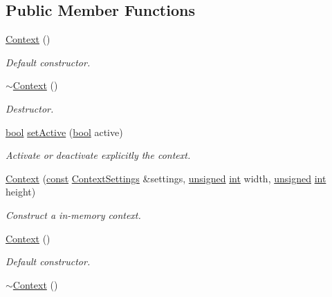 \subsection*{Public Member Functions}
\begin{DoxyCompactItemize}
\item 
\hyperlink{classsf_1_1_context_aba22797a790706ca2c5c04ee39f2b555}{Context} ()
\begin{DoxyCompactList}\small\item\em Default constructor. \end{DoxyCompactList}\item 
\hyperlink{classsf_1_1_context_a805b1bbdb3e52b1fda7c9bf2cd6ca86b}{$\sim$\-Context} ()
\begin{DoxyCompactList}\small\item\em Destructor. \end{DoxyCompactList}\item 
\hyperlink{term__entry_8h_a002004ba5d663f149f6c38064926abac}{bool} \hyperlink{classsf_1_1_context_a0806f915ea81ae1f4e8135a7a3696562}{set\-Active} (\hyperlink{term__entry_8h_a002004ba5d663f149f6c38064926abac}{bool} active)
\begin{DoxyCompactList}\small\item\em Activate or deactivate explicitly the context. \end{DoxyCompactList}\item 
\hyperlink{classsf_1_1_context_a2a9e3529e48919120e6b6fc10bad296c}{Context} (\hyperlink{term__entry_8h_a57bd63ce7f9a353488880e3de6692d5a}{const} \hyperlink{structsf_1_1_context_settings}{Context\-Settings} \&settings, \hyperlink{curses_8priv_8h_aca40206900cfc164654362fa8d4ad1e6}{unsigned} \hyperlink{term__entry_8h_ad65b480f8c8270356b45a9890f6499ae}{int} width, \hyperlink{curses_8priv_8h_aca40206900cfc164654362fa8d4ad1e6}{unsigned} \hyperlink{term__entry_8h_ad65b480f8c8270356b45a9890f6499ae}{int} height)
\begin{DoxyCompactList}\small\item\em Construct a in-\/memory context. \end{DoxyCompactList}\item 
\hyperlink{classsf_1_1_context_aba22797a790706ca2c5c04ee39f2b555}{Context} ()
\begin{DoxyCompactList}\small\item\em Default constructor. \end{DoxyCompactList}\item 
\hyperlink{classsf_1_1_context_a805b1bbdb3e52b1fda7c9bf2cd6ca86b}{$\sim$\-Context} ()

\end{DoxyCompactItemize}
